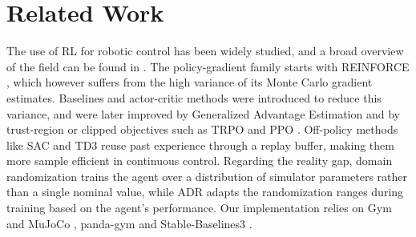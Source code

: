 \section{Related Work}
The use of RL for robotic control has been widely studied, and a broad overview of the field can be found in \cite{Kober2013}.
The policy-gradient family starts with REINFORCE \cite{Williams1992}, which however suffers from the high variance of its Monte Carlo gradient estimates.
Baselines and actor-critic methods \cite{SuttonBarto2018} were introduced to reduce this variance, and were later improved by Generalized Advantage Estimation \cite{SchulmanGAE2015} and by trust-region or clipped objectives such as TRPO and PPO \cite{SchulmanTRPO2015, SchulmanPPO2017}.
Off-policy methods like SAC \cite{SAC2018} and TD3 \cite{Fujimoto2018} reuse past experience through a replay buffer, making them more sample efficient in continuous control.
Regarding the reality gap, domain randomization \cite{Tobin2017} trains the agent over a distribution of simulator parameters rather than a single nominal value, while ADR \cite{rubikADR2019} adapts the randomization ranges during training based on the agent's performance.
Our implementation relies on Gym and MuJoCo \cite{Brockman2016, Todorov2012}, panda-gym \cite{gallouedec2021pandagym} and Stable-Baselines3 \cite{stable-baselines3}.

